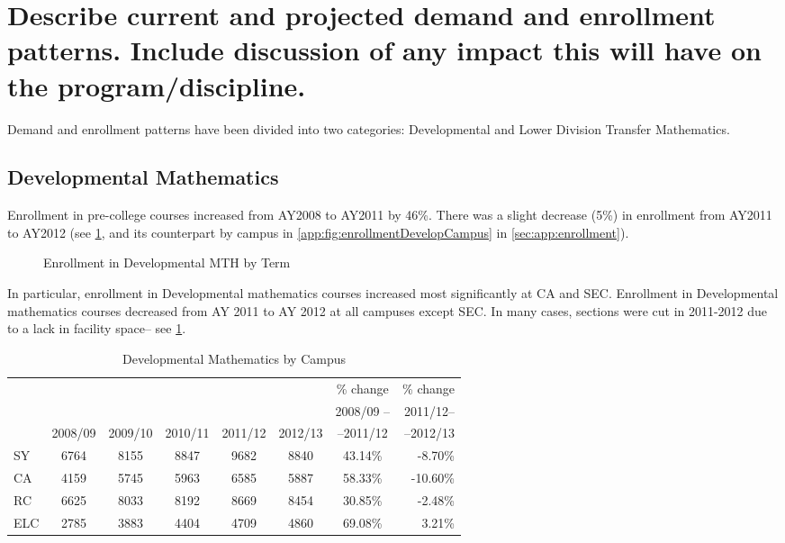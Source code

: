 \section{Describe current and projected demand and enrollment patterns.  Include discussion of any impact this will have on the program/discipline.
}
Demand and enrollment patterns have been divided into two categories: Developmental and Lower Division Transfer Mathematics.

\subsection{Developmental Mathematics}
Enrollment in pre-college courses increased from AY2008 to AY2011 by 46\%. There was a slight decrease (5\%) in enrollment from AY2011 to AY2012 (see \cref{needs:fig:enrollmentDevelopTerm}, and its counterpart by campus in \vref{app:fig:enrollmentDevelopCampus} in \cref{sec:app:enrollment}).

\begin{figure}[!htb]
	\centering
	
	\caption{Enrollment in Developmental MTH by Term}
	\label{needs:fig:enrollmentDevelopTerm}
\end{figure}

In particular, enrollment in Developmental mathematics courses increased most significantly at CA and SEC. Enrollment in Developmental mathematics courses decreased from AY 2011 to AY 2012 at all campuses except SEC. In many cases, sections were cut in 2011-2012 due to a lack in facility space-- see \cref{needs:tab:enrollmentDevelp}. 


\begin{table}[!htb]
	\caption{Developmental Mathematics by Campus}
	\label{needs:tab:enrollmentDevelp}
	\begin{tabular}{l*{6}{c}r}
		\toprule
		    &        &        &        &        &        & \% change & \% change \\
		    &		&	&	&	&	&2008/09 --	&2011/12--\\
		    & 2008/09 & 2009/10 & 2010/11 & 2011/12 & 2012/13 & --2011/12 &--2012/13 \\
		\midrule
		SY  & 6764   & 8155   & 8847   & 9682   & 8840   & 43.14\%   & -8.70\%   \\
		CA  & 4159   & 5745   & 5963   & 6585   & 5887   & 58.33\%   & -10.60\%  \\
		RC  & 6625   & 8033   & 8192   & 8669   & 8454   & 30.85\%   & -2.48\%   \\
		ELC & 2785   & 3883   & 4404   & 4709   & 4860   & 69.08\%   & 3.21\%    \\
		\bottomrule
	\end{tabular}
\end{table}

